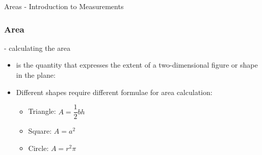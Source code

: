 \begin{omgroup}{Areas - Introduction to Measurements}
\begin{module}[id=area]
\begin{frame}
  \frametitle{Area}
  - calculating the area\\
      \begin{itemize}
      \item
      \begin{definition}
         is the quantity that expresses the extent of a two-dimensional figure or shape in the plane:
      \end{definition}
    \end{itemize}
\begin{itemize}
\item Different shapes require different formulae for area calculation:
  	\begin{itemize}
  	\item Triangle: $A = \dfrac{1}{2}bh$
  	\item Square: $A = a^2$
    \item Circle: $A = r^2\pi$
	\end{itemize}
\end{itemize}
\end{frame}
\end{module}
\end{omgroup}
